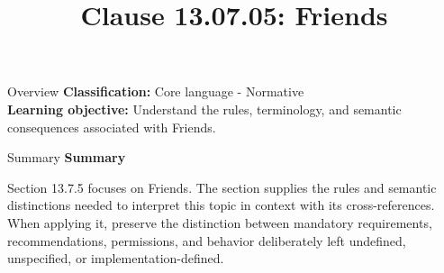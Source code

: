 \documentclass[10pt,letterpaper]{article}
\title{Clause 13.07.05: Friends}
\author{}
\date{}
\begin{document}
\maketitle
\begin{CornellOverviewBox}{Overview}
\textbf{Classification:} Core language - Normative\\[2pt]
\textbf{Learning objective:} Understand the rules, terminology, and semantic consequences associated with Friends.
\end{CornellOverviewBox}\begin{CornellSummaryBox}{Summary}
{\sffamily\bfseries\color{Accent} Summary}\par\vspace{3pt}Section 13.7.5 focuses on Friends. The section supplies the rules and semantic distinctions needed to interpret this topic in context with its cross-references. When applying it, preserve the distinction between mandatory requirements, recommendations, permissions, and behavior deliberately left undefined, unspecified, or implementation-defined.
\end{CornellSummaryBox}
\end{document}

